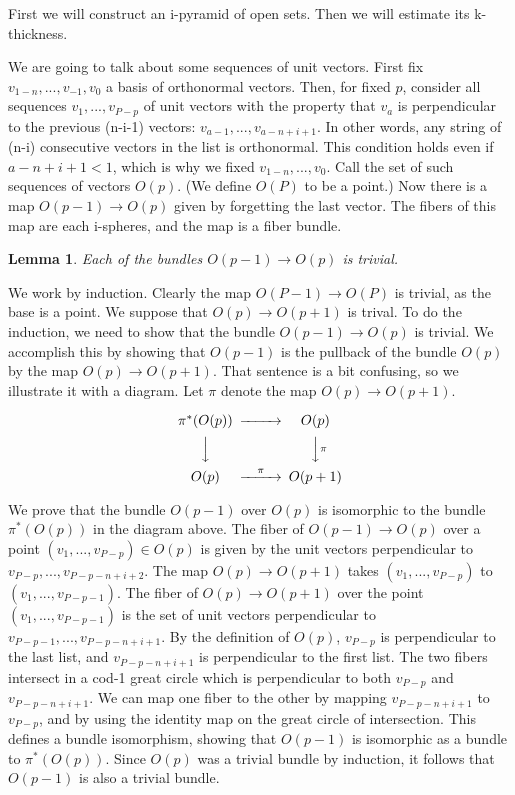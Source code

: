 \documentclass{amsart}
\newtheorem*{Theorem 1}{Theorem 1}
\newtheorem*{Theorem 2}{Theorem 2}
\newtheorem*{Theorem 1A}{Theorem 1A}
\newtheorem*{Theorem 2A}{Theorem 2A}
\newtheorem{lemma}{Lemma}[section]
\newtheorem*{vanishing lemma}{Vanishing Lemma}
\numberwithin{equation}{section}
\begin{document}
\proof First we will construct an i-pyramid of open sets.  Then we will
estimate its k-thickness.

We are going to talk about some sequences of unit vectors.  First fix
$v_{1-n}, ...,v_{-1}, v_0$ a basis of orthonormal vectors.  Then, for fixed
$p$, 
consider all sequences $v_1, ..., v_{P-p}$ of unit vectors with
the property that $v_a$ is perpendicular to the previous (n-i-1)
vectors: $v_{a-1}, ..., v_{a-n+i+1}$.  In other words, any string
of (n-i) consecutive vectors in the list is orthonormal.  This
condition holds even if $a-n+i+1 < 1$, which is why we 
fixed $v_{1-n},... , v_0$.  Call the set of such
sequences of vectors $O(p)$.  (We define $O(P)$ to be a point.) 
Now there is a map $O(p-1) \rightarrow O(p)$ given by forgetting
the last vector.  The fibers of this map are each i-spheres, and
the map is a fiber bundle.

\begin{lemma} Each of the bundles $O(p-1) \rightarrow O(p)$ is
trivial.
\end{lemma}

\proof We work by induction.  Clearly the map $O(P-1) \rightarrow O(P)$
is trivial, as the base is a point.  We suppose that $O(p)
\rightarrow O(p+1)$ is trival.  To do the induction, we need to show that
the bundle $O(p-1) \rightarrow O(p)$ is trivial.  We accomplish this by
showing that $O(p-1)$ is the pullback of the bundle $O(p)$ by the map $O(p)
\rightarrow O(p+1)$.  That sentence is a bit confusing, so we illustrate it
with a diagram.  Let $\pi$ denote the map $O(p) \rightarrow O(p+1)$.

\[
\begin{CD}
\pi^*(O(p)) @>>> O(p) \\
@VVV @VV\pi V \\
O(p) @>\pi>> O(p+1)
\end{CD}
\]

We prove that the bundle $O(p-1)$ over $O(p)$ is isomorphic to the bundle
$\pi^*(O(p))$ in the diagram above.  
The fiber of $O(p-1) \rightarrow O(p)$ over a point $(v_1, ...,
v_{P-p}) \in O(p)$ is given by the unit vectors perpendicular to
$v_{P-p}, ..., v_{P-p-n+i+2}$.  The map $O(p) \rightarrow O(p+1)$
takes $(v_1, ..., v_{P-p})$ to $(v_1, ..., v_{P-p-1})$.  The
fiber of $O(p) \rightarrow O(p+1)$ over the point $(v_1, ..., v_{P-p-1})$
is the set of
unit vectors perpendicular to $v_{P-p-1}, ..., v_{P-p-n+i+1}$. 
By the definition of $O(p)$, $v_{P-p}$ is perpendicular to the
last list, and $v_{P-p-n+i+1}$ is perpendicular to the first list. 
The two fibers intersect in a cod-1 great circle which is
perpendicular to both $v_{P-p}$ and $v_{P-p-n+i+1}$.
We can map one fiber to the other by mapping $v_{P-p-n+i+1}$ to
$v_{P-p}$, and by using the identity map on the great circle of
intersection.  This defines a bundle isomorphism, showing that
$O(p-1)$ is isomorphic as a bundle to $\pi^*(O(p))$.  Since
$O(p)$ was a trivial bundle by induction, it follows that
$O(p-1)$ is also a trivial bundle. \endproof
\end{document}

